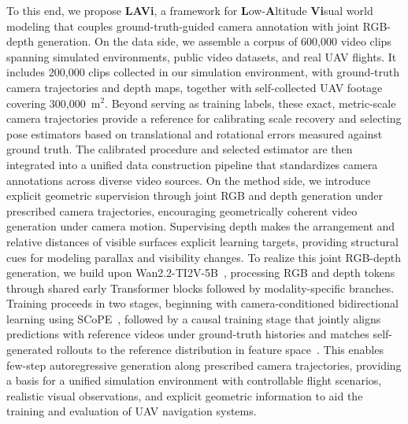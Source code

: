 To this end, we propose \textbf{LAVi}, a framework for \textbf{L}ow-\textbf{A}ltitude \textbf{Vi}sual world modeling that couples ground-truth-guided camera annotation with joint RGB-depth generation.
%
On the data side, we assemble a corpus of 600,000 video clips spanning simulated environments, public video datasets, and real UAV flights.
%
It includes 200,000 clips collected in our simulation environment, with ground-truth camera trajectories and depth maps, together with self-collected UAV footage covering 300,000~m$^2$.
%
Beyond serving as training labels, these exact, metric-scale camera trajectories provide a reference for calibrating scale recovery and selecting pose estimators based on translational and rotational errors measured against ground truth.
%
The calibrated procedure and selected estimator are then integrated into a unified data construction pipeline that standardizes camera annotations across diverse video sources.
%
On the method side, we introduce explicit geometric supervision through joint RGB and depth generation under prescribed camera trajectories, encouraging geometrically coherent video generation under camera motion.
%
Supervising depth makes the arrangement and relative distances of visible surfaces explicit learning targets, providing structural cues for modeling parallax and visibility changes.
%
To realize this joint RGB-depth generation, we build upon Wan2.2-TI2V-5B~\cite{wan2025wanopenadvancedlargescale}, processing RGB and depth tokens through shared early Transformer blocks followed by modality-specific branches.
%
Training proceeds in two stages, beginning with camera-conditioned bidirectional learning using SCoPE~\cite{yin2026scope}, followed by a causal training stage that jointly aligns predictions with reference videos under ground-truth histories and matches self-generated rollouts to the reference distribution in feature space~\cite{xu2026directforcingsinglestagetraining}.
%
This enables few-step autoregressive generation along prescribed camera trajectories, providing a basis for a unified simulation environment with controllable flight scenarios, realistic visual observations, and explicit geometric information to aid the training and evaluation of UAV navigation systems.

